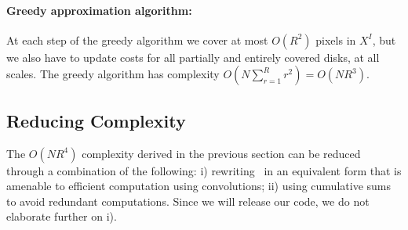 \documentclass[10pt,twocolumn,letterpaper]{article}
\begin{document}

\paragraph{Greedy approximation algorithm:} At each step of the greedy algorithm we cover at most $O(R^2)$ pixels in $X^I$,
but we also have to update costs for all partially and entirely covered disks, at all scales.
The greedy algorithm has complexity $O(N\sum_{r=1}^R r^2) = O(NR^3)$.


\subsection{Reducing Complexity}\label{sec:complexity:reducing}
The $O(NR^4)$ complexity derived in the previous section can be reduced through a combination of the following: 
i) rewriting~ in an equivalent form that is amenable to efficient computation using convolutions; 
ii) using cumulative sums to avoid redundant computations.
Since we will release our code, we do not elaborate further on i).
\end{document}
